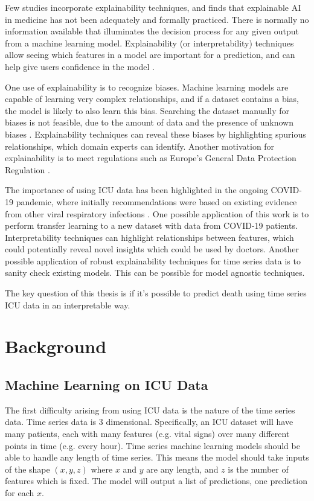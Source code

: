 \documentclass[12pt]{article}
\begin{document}
Few studies incorporate explainability techniques, and \cite{XAIICUReview} finds that 
explainable AI in medicine has not been adequately and formally practiced. There is normally no information available that illuminates the decision process for any given output from a machine learning model. Explainability (or interpretability) techniques allow seeing which features  in a model are important for a prediction, and can help give users confidence in the model \cite{YoungKyle2019Dnno}.

One use of explainability is to recognize biases. Machine learning models are capable of learning very complex relationships, and if a dataset contains a bias, the model is likely to also learn this bias. Searching the dataset manually for biases is not feasible, due to the amount of data and the presence of unknown biases \cite{YoungKyle2019Dnno}. Explainability techniques can reveal these biases by highlighting spurious relationships, which domain experts can identify. Another motivation for explainability is to meet regulations such as Europe's General Data Protection Regulation \cite{XAIICUReview}.

The importance of using ICU data has been highlighted in the ongoing COVID-19 pandemic, where initially recommendations were based on existing evidence from other viral respiratory infections \cite{COVID19}. One possible application of this work is to perform transfer learning to a new dataset with  data from COVID-19 patients. Interpretability techniques can highlight relationships between features, which could potentially reveal novel insights which could be used by doctors. Another possible application of robust explainability techniques for time series data is to sanity check existing models. This can be possible for model agnostic techniques.

The key question of this thesis is if it's possible to predict death using time series ICU data in an interpretable way.

\section{Background}

\subsection{Machine Learning on ICU Data}
\label{Machine Learning on ICU Data}
The first difficulty arising from using ICU data is the nature of the time series data. Time series data is 3 dimensional. Specifically, an ICU dataset will have many patients, each with many features (e.g. vital signs) over many different points in time (e.g. every hour). Time series machine learning models should be able to handle any length of time series. This means the model should take inputs of the shape $(x,y,z)$ where $x$ and $y$ are any length, and $z$ is the number of features which is fixed. The model will output a list of predictions, one prediction for each $x$.
\end{document}
